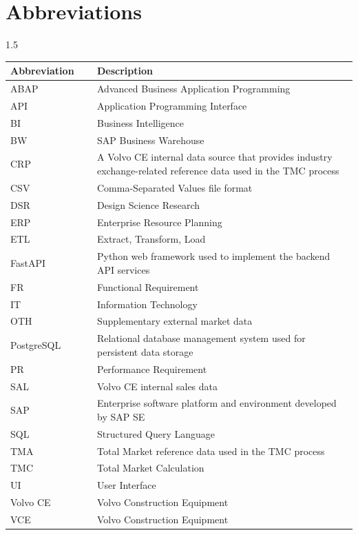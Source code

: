 \chapter*{Abbreviations} 

\begin{spacing}{1.5}
\begin{longtable}{>{\raggedright\arraybackslash}p{0.25\linewidth}>{\raggedright\arraybackslash}p{0.75\linewidth}}
    \textbf{Abbreviation} & \textbf{Description} \\
    \hline
ABAP & Advanced Business Application Programming \\
API & Application Programming Interface \\
BI & Business Intelligence \\
BW & SAP Business Warehouse \\
CRP & A Volvo CE internal data source that provides industry exchange-related reference data used in the TMC process \\
CSV & Comma-Separated Values file format \\
DSR & Design Science Research \\
ERP & Enterprise Resource Planning \\
ETL & Extract, Transform, Load \\
FastAPI & Python web framework used to implement the backend API services \\
FR & Functional Requirement \\
IT & Information Technology \\
OTH & Supplementary external market data \\
PostgreSQL & Relational database management system used for persistent data storage \\
PR & Performance Requirement \\
SAL & Volvo CE internal sales data \\
SAP & Enterprise software platform and environment developed by SAP SE \\
SQL & Structured Query Language \\
TMA & Total Market reference data used in the TMC process \\
TMC & Total Market Calculation \\
UI & User Interface \\
Volvo CE & Volvo Construction Equipment \\
VCE & Volvo Construction Equipment \\
\end{longtable}
\end{spacing}

